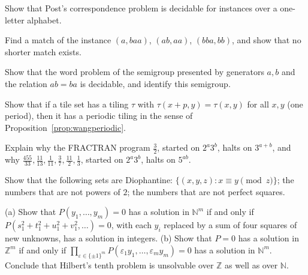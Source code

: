 \begin{exercise}[$\star$]\label{ex:pcpunary}
Show that Post's correspondence problem is decidable for instances over a one-letter alphabet.
\end{exercise}

\begin{exercise}[$\star$]\label{ex:pcphand}
Find a match of the instance $(a,baa)$, $(ab,aa)$, $(bba,bb)$, and show that no shorter match exists.
\end{exercise}

\begin{exercise}[$\star$]\label{ex:commutative}
Show that the word problem of the semigroup presented by generators $a,b$ and the relation $ab=ba$ is decidable, and identify this semigroup.
\end{exercise}

\begin{exercise}[$\star\star$]\label{ex:singlyperiodic}
Show that if a tile set has a tiling $\tau$ with $\tau(x+p,y)=\tau(x,y)$ for all $x,y$ (one period), then it has a periodic tiling in the sense of Proposition~\ref{prop:wangperiodic}.
\end{exercise}

\begin{exercise}[$\star\star$]\label{ex:fractranmult}
Explain why the FRACTRAN program $\frac32$, started on $2^a3^b$, halts on $3^{a+b}$, and why $\frac{455}{33},\frac{11}{13},\frac1{11},\frac37,\frac{11}2,\frac13$, started on $2^a3^b$, halts on $5^{ab}$.
\end{exercise}

\begin{exercise}[$\star$]\label{ex:diophsets}
Show that the following sets are Diophantine: $\{(x,y,z):x\equiv y\pmod z\}$; the numbers that are not powers of $2$; the numbers that are not perfect squares.
\end{exercise}

\begin{exercise}[$\star\star$]\label{ex:integers}
(a) Show that $P(y_1,\dots,y_m)=0$ has a solution in $\mathbb N^m$ if and only if $P(s_1^2+t_1^2+u_1^2+v_1^2,\dots)=0$, with each $y_i$ replaced by a sum of four squares of new unknowns, has a solution in integers. (b) Show that $P=0$ has a solution in $\mathbb Z^m$ if and only if $\prod_{\varepsilon\in\{\pm1\}^m}P(\varepsilon_1y_1,\dots,\varepsilon_my_m)=0$ has a solution in $\mathbb N^m$. Conclude that Hilbert's tenth problem is unsolvable over $\mathbb Z$ as well as over $\mathbb N$.
\end{exercise}

